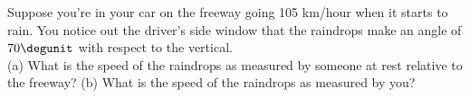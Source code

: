 Suppose you're in your car on the freeway going 105 km/hour
when it starts to rain. You notice out the driver's side window that
the raindrops make an angle of $70\degunit$ with respect to the
vertical.\\
%
(a) What is the speed of the raindrops as measured by someone 
at rest relative to the freeway?\answercheck\hwendpart
%
(b) What is the speed of the raindrops as measured by you?\answercheck
